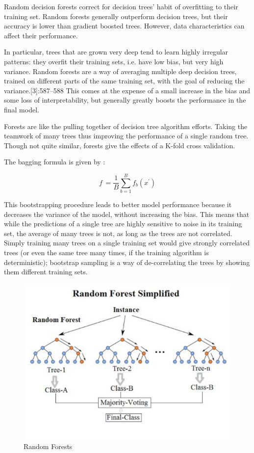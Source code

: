 \documentclass[12pt]{article}
\begin{document}
Random decision forests correct for decision trees' habit of overfitting to their training set. Random forests generally outperform decision trees, but their accuracy is lower than gradient boosted trees. However, data characteristics can affect their performance.

In particular, trees that are grown very deep tend to learn highly irregular patterns: they overfit their training sets, i.e. have low bias, but very high variance. Random forests are a way of averaging multiple deep decision trees, trained on different parts of the same training set, with the goal of reducing the variance.[3]:587–588 This comes at the expense of a small increase in the bias and some loss of interpretability, but generally greatly boosts the performance in the final model.

Forests are like the pulling together of decision tree algorithm efforts. Taking the teamwork of many trees thus improving the performance of a single random tree. Though not quite similar, forests give the effects of a K-fold cross validation.

The bagging formula is given by : 

\begin{equation*} 
f^{~}= \frac{1}{B}\sum_{b=1}^{B}{f_b(x^{'})}
\end{equation*}

This bootstrapping procedure leads to better model performance because it decreases the variance of the model, without increasing the bias. This means that while the predictions of a single tree are highly sensitive to noise in its training set, the average of many trees is not, as long as the trees are not correlated. Simply training many trees on a single training set would give strongly correlated trees (or even the same tree many times, if the training algorithm is deterministic); bootstrap sampling is a way of de-correlating the trees by showing them different training sets.

\begin{center}
\begin{figure}[h]
\centerline{\includegraphics[scale=.5]{IMG_8206.jpg}}
\caption{Random Forests}
\end{figure}
\end{center}
\end{document}
